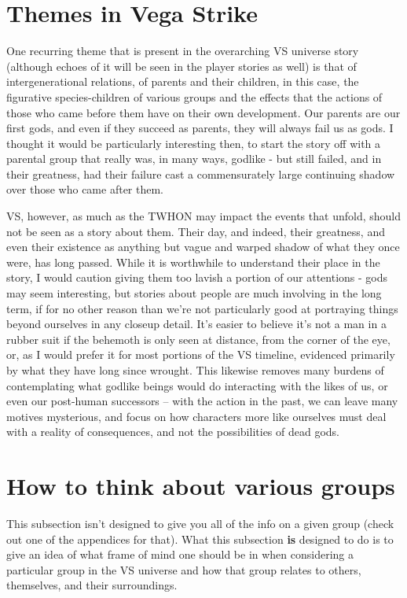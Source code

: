\section{Themes in Vega Strike}
\label{sec:VSthemes}
One recurring theme that is present in the overarching VS universe
story (although echoes of it will be seen in the player stories as
well) is that of intergenerational relations, of parents and their
children, in this case, the figurative species-children of various
groups and the effects that the actions of those who came before them
have on their own development. Our parents are our first gods, and
even if they succeed as parents, they will always fail us as gods. I
thought it would be particularly interesting then, to start the story
off with a parental group that really was, in many ways, godlike - but
still failed, and in their greatness, had their failure cast a
commensurately large continuing shadow over those who came after them.

VS, however, as much as the TWHON may impact the events that unfold,
should not be seen as a story about them. Their day, and indeed, their
greatness, and even their existence as anything but vague and warped
shadow of what they once were, has long passed. While it is worthwhile
to understand their place in the story, I would caution giving them
too lavish a portion of our attentions - gods may seem interesting,
but stories about people are much involving in the long term, if for
no other reason than we're not particularly good at portraying things
beyond ourselves in any closeup detail. It's easier to believe it's
not a man in a rubber suit if the behemoth is only seen at distance,
from the corner of the eye, or, as I would prefer it for most portions
of the VS timeline, evidenced primarily by what they have long since
wrought. This likewise removes many burdens of contemplating what
godlike beings would do interacting with the likes of us, or even our
post-human successors -- with the action in the past, we can leave
many motives mysterious, and focus on how characters more like
ourselves must deal with a reality of consequences, and not the
possibilities of dead gods.

\section{How to think about various groups}
\label{sec:groupintuitions}
This subsection isn't designed to give you all of the info on a given
group (check out one of the appendices for that). What this subsection
{\bf is} designed to do is to give an idea of what frame of mind one
should be in when considering a particular group in the VS universe
and how that group relates to others, themselves, and their
surroundings.

